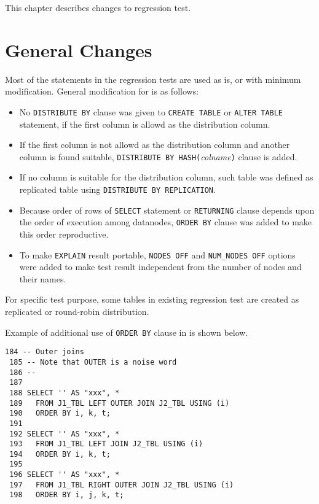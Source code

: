 %
%
%


  This chapter describes changes to regression test.



\section{General Changes}

  Most of the statements in the regression tests are used as is, or with minimum modification.
  General modification for \XC{} is as follows:
  
  \begin{itemize}
	  \item No \texttt{DISTRIBUTE BY} clause was given to \texttt{CREATE TABLE} or \texttt{ALTER TABLE}
	  		statement, if the first column is allowd as the distribution column.
	  \item If the first column is not allowd as the distribution column and another column
	  		is found suitable, \texttt{DISTRIBUTE BY HASH(}\textit{colname}\texttt{)}
			clause is added.
	  \item If no column is suitable for the distribution column, such table was defined as
	  		replicated table using \texttt{DISTRIBUTE BY REPLICATION}.
	  \item Because order of rows of \texttt{SELECT} statement or \texttt{RETURNING} clause depends upon
	  		the order of execution among datanodes, \texttt{ORDER BY} clause was added to make this
			order reproductive.
	  \item To make \texttt{EXPLAIN} result portable, \texttt{NODES OFF} and
			\texttt{NUM\_NODES OFF} options were added to make test result independent from
			the number of nodes and their names.
  \end{itemize}
  
  For specific test purpose, some tables in existing \PG{} regression test are created as
  replicated or round-robin distribution.
  
  Example of additional use of \texttt{ORDER BY} clause in  is shown below.

  \lstset{tabsize=4, xleftmargin=20pt, basicstyle=\ttfamily\small, breaklines=true}
  \begin{lstlisting}[frame=single]
 184 -- Outer joins
 185 -- Note that OUTER is a noise word
 186 --
 187 
 188 SELECT '' AS "xxx", *
 189   FROM J1_TBL LEFT OUTER JOIN J2_TBL USING (i)
 190   ORDER BY i, k, t;
 191 
 192 SELECT '' AS "xxx", *
 193   FROM J1_TBL LEFT JOIN J2_TBL USING (i)
 194   ORDER BY i, k, t;
 195 
 196 SELECT '' AS "xxx", *
 197   FROM J1_TBL RIGHT OUTER JOIN J2_TBL USING (i)
 198   ORDER BY i, j, k, t;
  \end{lstlisting}

